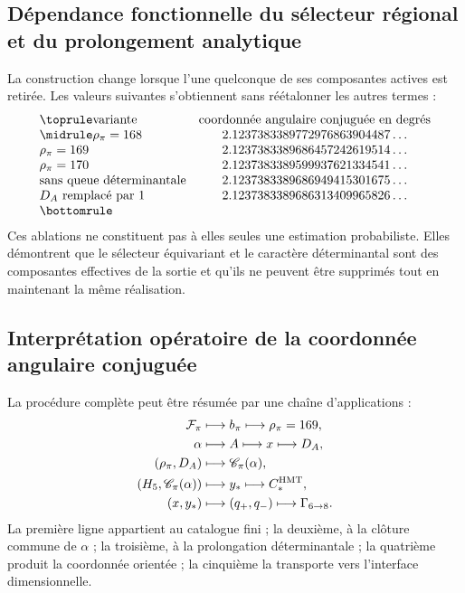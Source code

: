 \subsection{Dépendance fonctionnelle du sélecteur régional et du prolongement analytique}
\label{sec:s102:c38:7:2}


La construction change lorsque l'une quelconque de ses composantes actives est retirée.
Les valeurs suivantes s'obtiennent sans réétalonner les autres termes :
\[
\begin{array}{@{}lc@{}}
\toprule
\text{variante}&\text{coordonnée angulaire conjuguée en degrés}\\
\midrule
\rho_\pi=168&2.1237383389772976863904487\ldots\\
\rho_\pi=169&2.1237383389686457242619514\ldots\\
\rho_\pi=170&2.1237383389599937621334541\ldots\\
\text{sans queue déterminantale}&2.1237383389686949415301675\ldots\\
D_A\text{ remplacé par }1&2.1237383389686313409965826\ldots\\
\bottomrule
\end{array}
\]
Ces ablations ne constituent pas à elles seules une estimation probabiliste.
Elles démontrent que le sélecteur équivariant et le caractère déterminantal sont
des composantes effectives de la sortie et qu'ils ne peuvent être supprimés tout en maintenant la
même réalisation.

\subsection{Interprétation opératoire de la coordonnée angulaire conjuguée}
\label{sec:s102:c38:7:3}


La procédure complète peut être résumée par une chaîne d'applications :
\[
\begin{aligned}
\mathcal F_\pi
&\longmapsto b_\pi
\longmapsto\rho_\pi=169,\\
\alpha
&\longmapsto A
\longmapsto x
\longmapsto D_A,\\
(\rho_\pi,D_A)
&\longmapsto\mathscr C_\pi(\alpha),\\
(H_5,\mathscr C_\pi(\alpha))
&\longmapsto y_*
\longmapsto C_*^{\rm HMT},\\
(x,y_*)
&\longmapsto(q_+,q_-)
\longmapsto\Gamma_{6\to8}.
\end{aligned}
\]
La première ligne appartient au catalogue fini ; la deuxième, à la clôture commune de
\(\alpha\) ; la troisième, à la prolongation déterminantale ; la quatrième produit la
coordonnée orientée ; la cinquième la transporte vers l'interface dimensionnelle.


